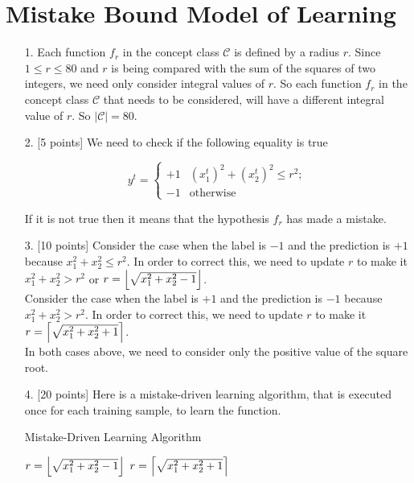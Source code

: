 \section{Mistake Bound Model of Learning}
\begin{enumerate}


\item[1.] Each function $f_r$ in the concept class $\mathcal{C}$ is defined by a radius $r$. Since $1 \leq r \leq 80$ and $r$ is being compared with the sum of the squares of two integers, we need only consider integral values of $r$. So each function  $f_r$ in the concept class $\mathcal{C}$ that needs to be considered, will have a different integral value of $r$. So $|\mathcal{C}| = 80$.
  
\item[2.] [5 points] We need to check if the following equality is true

\begin{equation*}
y^t = \left\{
    \begin{array}{rl}
      +1 & (x_1^t)^2 + (x_2^t)^2 \leq r^2;\\
      -1 & \mbox{otherwise}
    \end{array}
\right.
\label{eq:f_r}
\end{equation*}

If it is not true then it means that the hypothesis $f_r$ has made a mistake.

\item[3.] [10 points] Consider the case when the label is $-1$ and the prediction is $+1$ because $x_1^2 + x_2^2 \leq r^2$. In order to correct this, we need to update $r$ to make it $x_1^2 + x_2^2 > r^2$ or $r = \floor*{\sqrt{x_1^2 + x_2^2 - 1}}$.\\

Consider the case when the label is $+1$ and the prediction is $-1$ because $x_1^2 + x_2^2 > r^2$. In order to correct this, we need to update $r$ to make it $r = \ceil*{\sqrt{x_1^2 + x_2^2 + 1}}$.\\

In both cases above, we need to consider only the positive value of the square root.

\item[4.] [20 points] Here is a mistake-driven learning algorithm, that is executed once for each training sample, to learn the function.

\begin{minipage}{\linewidth}
  \begin{algorithm}[H]
    \caption{Mistake-Driven Learning Algorithm}\label{MDLA}
    \begin{algorithmic}[1]
	    \State $r = \floor*{\sqrt{x_1^2 + x_2^2 - 1}}$
	  \EndIf
	\Else 
	   \State $r = \ceil*{\sqrt{x_1^2 + x_2^2 + 1}}$
	  \EndIf
	\EndIf
      \EndProcedure
    \end{algorithmic}
  \end{algorithm}
\end{minipage}\\


\end{enumerate}

